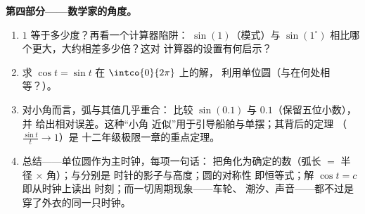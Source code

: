 \begin{problem}
\medskip
\noindent\textbf{第四部分——数学家的角度。}
\begin{enumerate}[resume]
  \item $1$ 等于多少度？再看一个计算器陷阱：
        $\sin(1)$（模式）与
        $\sin(1^\circ)$ 相比哪个更大，大约相差多少倍？这对
        计算器的设置有何启示？
  \item 求 $\cos t = \sin t$ 在 $\intco{0}{2\pi}$ 上的解，
        利用单位圆（与在何处相等？）。
  \item 对小角而言，弧与其值几乎重合：
        比较 $\sin(0.1)$ 与 $0.1$（保留五位小数），并
        给出相对误差。这种“小角
        近似”用于引导船舶与单摆；其背后的定理
        （$\frac{\sin t}{t} \to 1$）是
        十二年级极限一章的重点定理。
  \item 总结——单位圆作为主时钟，每项一句话：
        把角化为确定的数（弧长
        $=$ 半径 $\times$ 角）；与分别是
        时针的影子与高度；圆的对称性
        即恒等式；解 $\cos t = c$ 即从时钟上读出
        时刻；而一切周期现象——车轮、
        潮汐、声音——都不过是穿了外衣的同一只时钟。
\end{enumerate}
\end{problem}

